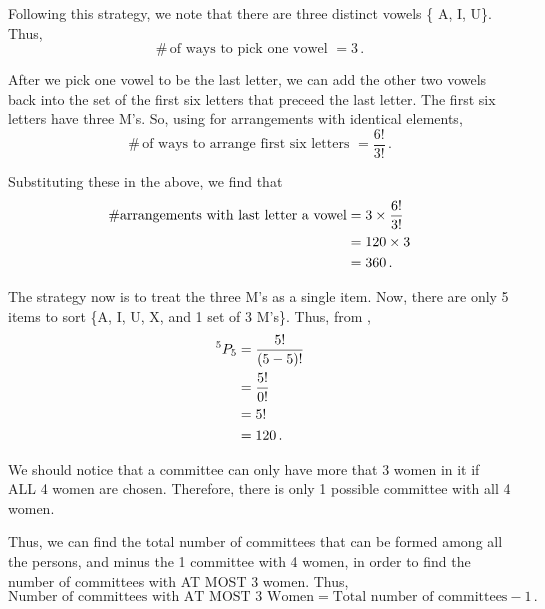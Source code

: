 \begin{subquestions}
\begin{subsubquestions}
Following this strategy, we note that there are three distinct vowels \{ A, I, U\}. Thus, 
\begin{equation}
	\#\,\text{of ways to pick one vowel } = 3 \,.
\end{equation}

After we pick one vowel to be the last letter, we can add the other two vowels back into the set of the first six letters that preceed the last letter. The first six letters have three M's. So, using  for arrangements with identical elements,
\begin{equation}
	\#\,\text{of ways to arrange first six letters } =\frac{6!}{3!} \,.
\end{equation}


Substituting these in the above, we find that
\begin{align}
	\# \text{arrangements with last letter a vowel}  &= 3 \times \frac{6!}{3!} \nonumber \\
	& = 120 \times 3 \nonumber \\
	                                            & = 360 \,.
\end{align}


\subsubquestion

The strategy now is to treat the three M's as a single item. Now, there are only 5 items to sort \{A, I, U, X, and 1 set of 3 M's\}. Thus, from ,
\begin{align}
	^{5}P_5 & = \frac{5!}{(5-5)!} \nonumber \\
	        & = \frac{5!}{0!} \nonumber \\
	        & = 5! \nonumber \\
	        & = 120 \,.
\end{align}

\end{subsubquestions}


\subquestion
{}
We should notice that a committee can only have more that 3 women in it if ALL 4 women are chosen. Therefore, there is only 1 possible committee with all 4 women. 

Thus, we can find the total number of committees that can be formed among all the persons, and minus the 1 committee with 4 women, in order to find the number of committees with AT MOST 3 women. Thus,
\begin{equation}
  	\text{Number of committees with AT MOST 3 Women} = \text{Total number of committees} - 1 \,.
\end{equation}


\end{subquestions}
